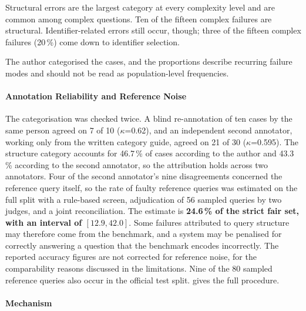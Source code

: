 Structural errors are the largest category at every complexity level and are common among complex questions. Ten of the fifteen complex failures are structural.
Identifier-related errors still occur, though; three of the fifteen complex failures (20\,\%) come down to identifier selection.

The author categorised the cases, and the proportions describe recurring failure modes and should not be read as population-level frequencies.

\paragraph{Annotation Reliability and Reference Noise}

The categorisation was checked twice.
A blind re-annotation of ten cases by the same person agreed on 7 of 10 ($\kappa$=0.62), and an independent second annotator, working only from the written category guide, agreed on 21 of 30 ($\kappa$=0.595).
The structure category accounts for 46.7\,\% of cases according to the author and 43.3\,\% according to the second annotator, so the attribution holds across two annotators.
Four of the second annotator's nine disagreements concerned the reference query itself, so the rate of faulty reference queries was estimated on the full split with a rule-based screen, adjudication of 56 sampled queries by two judges, and a joint reconciliation.
The estimate is \textbf{24.6\,\% of the strict fair set, with an interval of $[12.9, 42.0]$}.
Some failures attributed to query structure may therefore come from the benchmark, and a system may be penalised for correctly answering a question that the benchmark encodes incorrectly.
The reported accuracy figures are not corrected for reference noise, for the comparability reasons discussed in the limitations.
Nine of the 80 sampled reference queries also occur in the official test split.
 gives the full procedure.

\paragraph{Mechanism}

